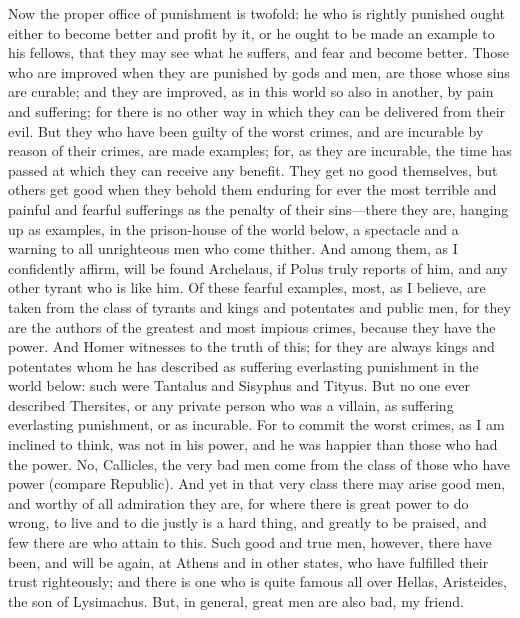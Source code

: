 \documentclass[11pt,letter]{article}
\begin{document}
\par  Now the proper office of punishment is twofold: he who is rightly punished ought either to become better and profit by it, or he ought to be made an example to his fellows, that they may see what he suffers, and fear and become better. Those who are improved when they are punished by gods and men, are those whose sins are curable; and they are improved, as in this world so also in another, by pain and suffering; for there is no other way in which they can be delivered from their evil. But they who have been guilty of the worst crimes, and are incurable by reason of their crimes, are made examples; for, as they are incurable, the time has passed at which they can receive any benefit. They get no good themselves, but others get good when they behold them enduring for ever the most terrible and painful and fearful sufferings as the penalty of their sins—there they are, hanging up as examples, in the prison-house of the world below, a spectacle and a warning to all unrighteous men who come thither. And among them, as I confidently affirm, will be found Archelaus, if Polus truly reports of him, and any other tyrant who is like him. Of these fearful examples, most, as I believe, are taken from the class of tyrants and kings and potentates and public men, for they are the authors of the greatest and most impious crimes, because they have the power. And Homer witnesses to the truth of this; for they are always kings and potentates whom he has described as suffering everlasting punishment in the world below: such were Tantalus and Sisyphus and Tityus. But no one ever described Thersites, or any private person who was a villain, as suffering everlasting punishment, or as incurable. For to commit the worst crimes, as I am inclined to think, was not in his power, and he was happier than those who had the power. No, Callicles, the very bad men come from the class of those who have power (compare Republic). And yet in that very class there may arise good men, and worthy of all admiration they are, for where there is great power to do wrong, to live and to die justly is a hard thing, and greatly to be praised, and few there are who attain to this. Such good and true men, however, there have been, and will be again, at Athens and in other states, who have fulfilled their trust righteously; and there is one who is quite famous all over Hellas, Aristeides, the son of Lysimachus. But, in general, great men are also bad, my friend.
\end{document}
